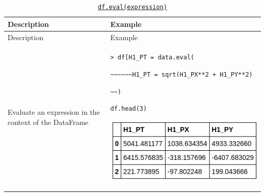 \documentclass[10pt,a4paperpaper,]{article}
\begin{document}
\begin{longtable}[]{@{}ll@{}}
\caption{\href{http://pandas.pydata.org/pandas-docs/stable/generated/pandas.DataFrame.eval.html}{\texttt{df.eval(expression)}}}\tabularnewline
\toprule
\begin{minipage}[b]{0.47\columnwidth}\raggedright\strut
Description
\strut\end{minipage} &
\begin{minipage}[b]{0.47\columnwidth}\raggedright\strut
Example
\strut\end{minipage}\tabularnewline
\midrule
\endfirsthead
\toprule
\begin{minipage}[b]{0.47\columnwidth}\raggedright\strut
Description
\strut\end{minipage} &
\begin{minipage}[b]{0.47\columnwidth}\raggedright\strut
Example
\strut\end{minipage}\tabularnewline
\midrule
\endhead
\begin{minipage}[t]{0.47\columnwidth}\raggedright\strut
Evaluate an expression in the context of the DataFrame
\strut\end{minipage} &
\begin{minipage}[t]{0.47\columnwidth}\raggedright\strut
\texttt{\textgreater{}\ df{[}\textquotesingle{}H1\_PT\textquotesingle{}{]}\ =\ data.eval(}

\texttt{\textasciitilde{}\textasciitilde{}\textasciitilde{}\textasciitilde{}\textasciitilde{}\textasciitilde{}\textquotesingle{}H1\_PT\ =\ sqrt(H1\_PX**2\ +\ H1\_PY**2)\textquotesingle{}}

\texttt{\textasciitilde{}\textasciitilde{})}

\texttt{df.head(3)}

\includegraphics[width=\textwidth]{assets/05-eval.png}
\strut\end{minipage}\tabularnewline
\bottomrule
\end{longtable}
\end{document}
